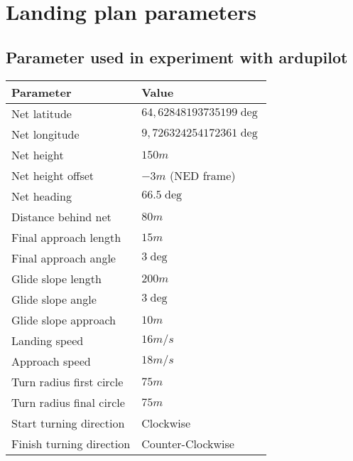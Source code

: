 \section{Landing plan parameters}

\subsection{Parameter used in experiment with ardupilot}

\begin{table}
\centering
\begin{tabular}{| p{} | p{} |}
\hline
\textbf{Parameter}			& \textbf{Value}			\\ \hline
Net latitude				& $64,62848193735199 \deg$ 	\\ \hline
Net longitude				& $9,726324254172361 \deg$ 	\\ \hline
Net height					& $150 m$					\\ \hline
Net height offset			& $-3 m$ (NED frame)		\\ \hline
Net heading					& $66.5 \deg$				\\ \hline
Distance behind net			& $80 m$					\\ \hline
Final approach length		& $15 m$					\\ \hline
Final approach angle		& $3 \deg$					\\ \hline
Glide slope length			& $200 m $					\\ \hline
Glide slope angle			& $3 \deg$					\\ \hline
Glide slope approach		& $10 m$					\\ \hline
Landing speed				& $16 m/s$					\\ \hline
Approach speed				& $18 m/s$					\\ \hline
Turn radius first circle	& $75 m$					\\ \hline
Turn radius final circle	& $75 m$					\\ \hline
Start turning direction		& Clockwise					\\ \hline
Finish turning direction	& Counter-Clockwise			\\ \hline
\end{tabular}
\end{table}